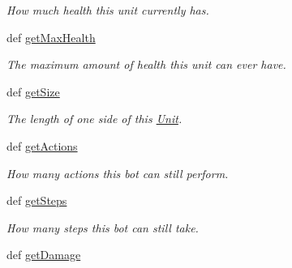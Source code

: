 \begin{DoxyCompactItemize}
\begin{DoxyCompactList}\small\item\em How much health this unit currently has. \item\end{DoxyCompactList}\item 
\hypertarget{classGameObject_1_1Bot_aae97e27e3951b3e7149378fa7ca8a74b}{
def \hyperlink{classGameObject_1_1Bot_aae97e27e3951b3e7149378fa7ca8a74b}{getMaxHealth}}
\label{classGameObject_1_1Bot_aae97e27e3951b3e7149378fa7ca8a74b}

\begin{DoxyCompactList}\small\item\em The maximum amount of health this unit can ever have. \item\end{DoxyCompactList}\item 
\hypertarget{classGameObject_1_1Bot_a4ff82e790545eae1767ce5ef581213e8}{
def \hyperlink{classGameObject_1_1Bot_a4ff82e790545eae1767ce5ef581213e8}{getSize}}
\label{classGameObject_1_1Bot_a4ff82e790545eae1767ce5ef581213e8}

\begin{DoxyCompactList}\small\item\em The length of one side of this \hyperlink{classGameObject_1_1Unit}{Unit}. \item\end{DoxyCompactList}\item 
\hypertarget{classGameObject_1_1Bot_ab65146e76f34066858a00e29a01d8aac}{
def \hyperlink{classGameObject_1_1Bot_ab65146e76f34066858a00e29a01d8aac}{getActions}}
\label{classGameObject_1_1Bot_ab65146e76f34066858a00e29a01d8aac}

\begin{DoxyCompactList}\small\item\em How many actions this bot can still perform. \item\end{DoxyCompactList}\item 
\hypertarget{classGameObject_1_1Bot_a9abaae7ee4a01ff06d13803eaf0ebc72}{
def \hyperlink{classGameObject_1_1Bot_a9abaae7ee4a01ff06d13803eaf0ebc72}{getSteps}}
\label{classGameObject_1_1Bot_a9abaae7ee4a01ff06d13803eaf0ebc72}

\begin{DoxyCompactList}\small\item\em How many steps this bot can still take. \item\end{DoxyCompactList}\item 
\hypertarget{classGameObject_1_1Bot_a30aa5cc047d6441579158e76d63896d9}{
def \hyperlink{classGameObject_1_1Bot_a30aa5cc047d6441579158e76d63896d9}{getDamage}}
\label{classGameObject_1_1Bot_a30aa5cc047d6441579158e76d63896d9}


\end{DoxyCompactItemize}
